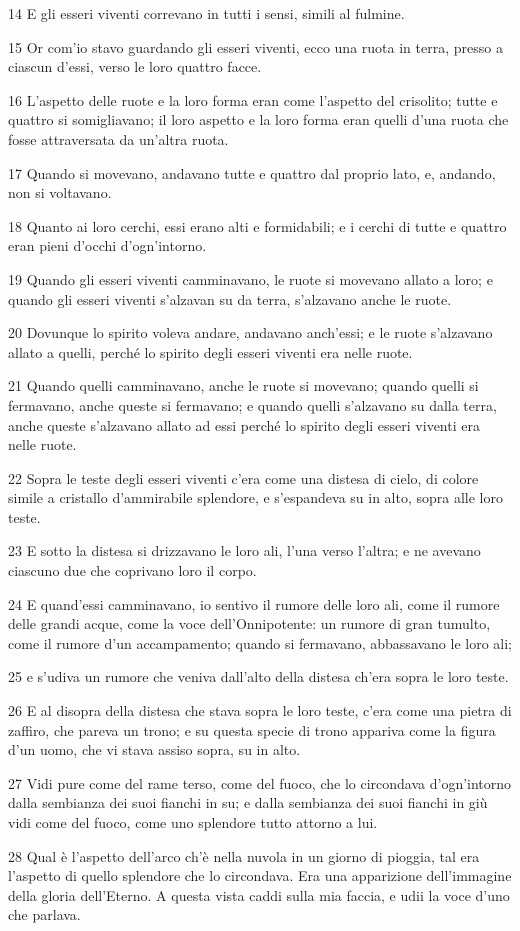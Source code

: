 \par 14 E gli esseri viventi correvano in tutti i sensi, simili al fulmine.
\par 15 Or com'io stavo guardando gli esseri viventi, ecco una ruota in terra, presso a ciascun d'essi, verso le loro quattro facce.
\par 16 L'aspetto delle ruote e la loro forma eran come l'aspetto del crisolito; tutte e quattro si somigliavano; il loro aspetto e la loro forma eran quelli d'una ruota che fosse attraversata da un'altra ruota.
\par 17 Quando si movevano, andavano tutte e quattro dal proprio lato, e, andando, non si voltavano.
\par 18 Quanto ai loro cerchi, essi erano alti e formidabili; e i cerchi di tutte e quattro eran pieni d'occhi d'ogn'intorno.
\par 19 Quando gli esseri viventi camminavano, le ruote si movevano allato a loro; e quando gli esseri viventi s'alzavan su da terra, s'alzavano anche le ruote.
\par 20 Dovunque lo spirito voleva andare, andavano anch'essi; e le ruote s'alzavano allato a quelli, perché lo spirito degli esseri viventi era nelle ruote.
\par 21 Quando quelli camminavano, anche le ruote si movevano; quando quelli si fermavano, anche queste si fermavano; e quando quelli s'alzavano su dalla terra, anche queste s'alzavano allato ad essi perché lo spirito degli esseri viventi era nelle ruote.
\par 22 Sopra le teste degli esseri viventi c'era come una distesa di cielo, di colore simile a cristallo d'ammirabile splendore, e s'espandeva su in alto, sopra alle loro teste.
\par 23 E sotto la distesa si drizzavano le loro ali, l'una verso l'altra; e ne avevano ciascuno due che coprivano loro il corpo.
\par 24 E quand'essi camminavano, io sentivo il rumore delle loro ali, come il rumore delle grandi acque, come la voce dell'Onnipotente: un rumore di gran tumulto, come il rumore d'un accampamento; quando si fermavano, abbassavano le loro ali;
\par 25 e s'udiva un rumore che veniva dall'alto della distesa ch'era sopra le loro teste.
\par 26 E al disopra della distesa che stava sopra le loro teste, c'era come una pietra di zaffiro, che pareva un trono; e su questa specie di trono appariva come la figura d'un uomo, che vi stava assiso sopra, su in alto.
\par 27 Vidi pure come del rame terso, come del fuoco, che lo circondava d'ogn'intorno dalla sembianza dei suoi fianchi in su; e dalla sembianza dei suoi fianchi in giù vidi come del fuoco, come uno splendore tutto attorno a lui.
\par 28 Qual è l'aspetto dell'arco ch'è nella nuvola in un giorno di pioggia, tal era l'aspetto di quello splendore che lo circondava. Era una apparizione dell'immagine della gloria dell'Eterno. A questa vista caddi sulla mia faccia, e udii la voce d'uno che parlava.

